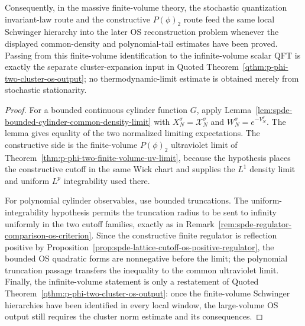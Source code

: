 \begin{proposition}
Consequently, in the massive finite-volume theory, the stochastic
quantization invariant-law route and the constructive \(P(\phi)_2\) route feed
the same local Schwinger hierarchy into the later OS reconstruction problem
whenever the displayed common-density and polynomial-tail estimates have been
proved.  Passing from this finite-volume identification to the infinite-volume
scalar QFT is exactly the separate cluster-expansion input in
Quoted Theorem~\ref{qthm:p-phi-two-cluster-os-output}; no thermodynamic-limit
estimate is obtained merely from stochastic stationarity.
\end{proposition}

\begin{proof}
For a bounded continuous cylinder function \(G\), apply
Lemma~\ref{lem:spde-bounded-cylinder-common-density-limit} with
\(X_N^\sigma=\mathcal X_N^\sigma\) and \(W_N^\sigma=e^{-V_N^\sigma}\).  The
lemma gives equality of the two normalized limiting expectations.  The
constructive side is the finite-volume \(P(\phi)_2\) ultraviolet limit of
Theorem~\ref{thm:p-phi-two-finite-volume-uv-limit}, because the hypothesis
places the constructive cutoff in the same Wick chart and supplies the
\(L^1\) density limit and uniform \(L^p\) integrability used there.

For polynomial cylinder observables, use bounded truncations.  The
uniform-integrability hypothesis permits the truncation radius to be sent to
infinity uniformly in the two cutoff families, exactly as in
Remark~\ref{rem:spde-regulator-comparison-os-criterion}.  Since the
constructive finite regulator is reflection positive by
Proposition~\ref{prop:spde-lattice-cutoff-os-positive-regulator}, the bounded
OS quadratic forms are nonnegative before the limit; the polynomial
truncation passage transfers the inequality to the common ultraviolet limit.
Finally, the infinite-volume statement is only a restatement of
Quoted Theorem~\ref{qthm:p-phi-two-cluster-os-output}: once the finite-volume
Schwinger hierarchies have been identified in every local window, the
large-volume OS output still requires the cluster norm estimate and its
consequences.
\end{proof}

